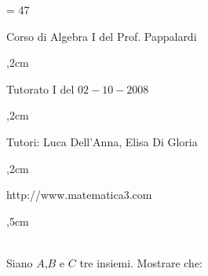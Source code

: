 \documentclass{article}
\begin{document}
\newtheorem{definition}{Definition}
\newtheorem{example}{Example}
\newtheorem{theorem}{Teorema}
\newtheorem{proposition}{Proposition}
\newtheorem{lemma}{Lemma}
\newtheorem{corollary}{Corollary}
\newtheorem{remark}{Remark}
\textheight = 47\baselineskip
{}
\def\stp{\stepcounter{pippo}}
\renewcommand{\theequation}{\arabic{section}.\arabic{equation}}
\renewcommand{\thetheorem}{\arabic{section}.\arabic{pippo}}
\renewcommand{\theexample}{\arabic{section}.\arabic{pippo}}
\renewcommand{\theremark}{\arabic{section}.\arabic{pippo}}
\renewcommand{\thedefinition}{\arabic{section}.\arabic{pippo}}
\renewcommand{\theproposition}{\arabic{section}.\arabic{pippo}}
\renewcommand{\thelemma}{\arabic{section}.\arabic{pippo}}
\renewcommand{\thecorollary}{\arabic{section}.\arabic{pippo}}
\newcommand{\cvd}{$\hfill \sqcap \hskip-6.5pt \sqcup$} %
\newcommand{\erre}{\mathop{{\rm I}\mskip -4.0mu{\rm R}}\nolimits}
\newcommand{\eps}{\varepsilon}
\newcommand{\na}{\nabla}
\newcommand{\ue}{u_\eps}
\newcommand{\Om}{\Omega}
\newcommand{\D}{\Delta}
\newcommand{\dd}{{\displaystyle}}
\newcommand{\lfr}{\longrightarrow}
\newcommand{\fr}{\rightarrow}
\newcommand{\vs}{\vskip0cm\noindent}
\newcommand{\1}{\lambda_{1}}
\newcommand{\2}{\lambda_{2}}
\newcommand{\INT}{\int_{\Omega}}
\newcommand{\un}{u_{n}}
\newcommand{\en}{e_{n}}
\newcommand{\acca}{H^{1}_{0}}
\newcommand{\be}{\begin{equation}}
\newcommand{\ee}{\end{equation}}
\newcommand{\beqa}{\begin{eqnarray}}
\newcommand{\eeqa}{\end{eqnarray}}
\newcommand{\vn}{v_{n}}
\centerline{Corso di Algebra I del Prof. Pappalardi}
,2cm
\centerline{Tutorato I del $02-10-2008$}
,2cm
\centerline{Tutori: Luca Dell'Anna, Elisa Di Gloria}
,2cm
\centerline{http://www.matematica3.com}
,5cm

\\
Siano $A$,$B$ e $C$ tre insiemi. Mostrare che:
\end{document}
